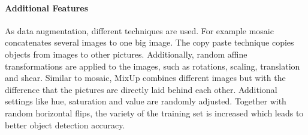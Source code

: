 \paragraph{Additional Features}
As data augmentation, different techniques are used. For example mosaic concatenates several images to one big image. The copy paste technique copies objects from images to other pictures.  Additionally, random affine transformations are applied to the images, such as rotations, scaling, translation and shear. Similar to mosaic, MixUp combines different images but with the difference that the pictures are directly laid behind each other. Additional settings like hue, saturation and value are randomly adjusted. Together with random horizontal flips, the variety of the training set is increased which leads to better object detection accuracy.
